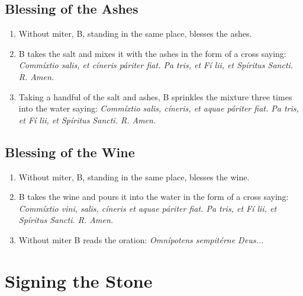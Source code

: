 \documentclass[twocolumn]{report}
\begin{document}
\subsection*{Blessing of the Ashes}
\begin{enumerate}
	\item Without miter, B, standing in the same place, blesses the ashes.
	\item B takes the salt and mixes it with the ashes in the form of a cross saying: \textit{Commíxtio salis, et cíneris páriter fiat. Pa  tris, et Fí  lii, et Spíritus  Sancti. R. Amen.}
	\item Taking a handful of the salt and ashes, B sprinkles the mixture three times into the water saying: \textit{Commíxtio salis, cíneris, et aquae páriter fiat. Pa  tris, et Fí  lii, et Spíritus  Sancti. R. Amen.}
\end{enumerate}
\subsection*{Blessing of the Wine}
\begin{enumerate}
	\item Without miter, B, standing in the same place, blesses the wine.
	\item B takes the wine and pours it into the water in the form of a cross saying: \textit{Commíxtio vini, salis, cíneris et aquae páriter fiat. Pa  tris, et Fí  lii, et Spíritus  Sancti. R. Amen.}
	\item Without miter B reads the oration: \textit{Omnípotens sempitérne Deus...}
\end{enumerate}
\section*{Signing the Stone}
\end{document}
